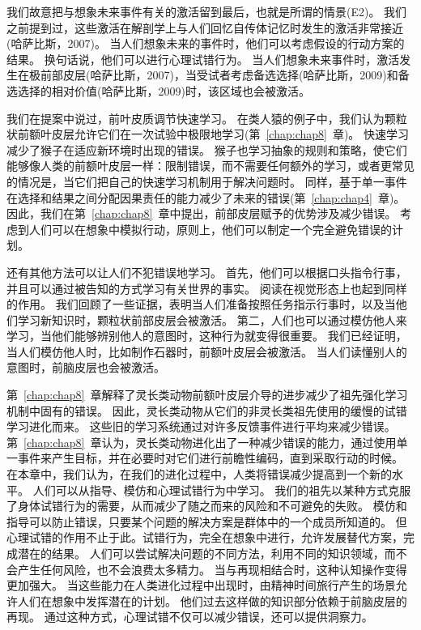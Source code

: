 我们故意把与想象未来事件有关的激活留到最后，也就是所谓的情景(E2)。
我们之前提到过，这些激活在解剖学上与人们回忆自传体记忆时发生的激活非常接近(哈萨比斯，2007)。
当人们想象未来的事件时，他们可以考虑假设的行动方案的结果。
换句话说，他们可以进行心理试错行为。
当人们想象未来事件时，激活发生在极前部皮层(哈萨比斯，2007)，当受试者考虑备选选择(哈萨比斯，2009)和备选选择的相对价值(哈萨比斯，2009)时，该区域也会被激活。


我们在提案中说过，前叶皮质调节快速学习。
在类人猿的例子中，我们认为颗粒状前额叶皮层允许它们在一次试验中极限地学习(第~\ref{chap:chap8}~章)。
快速学习减少了猴子在适应新环境时出现的错误。
猴子也学习抽象的规则和策略，使它们能够像人类的前额叶皮层一样：限制错误，而不需要任何额外的学习，或者更常见的情况是，当它们把自己的快速学习机制用于解决问题时。
同样，基于单一事件在选择和结果之间分配因果责任的能力减少了未来的错误(第~\ref{chap:chap4}~章)。
因此，我们在第~\ref{chap:chap8}~章中提出，前部皮层赋予的优势涉及减少错误。
考虑到人们可以在想象中模拟行动，原则上，他们可以制定一个完全避免错误的计划。


还有其他方法可以让人们不犯错误地学习。
首先，他们可以根据口头指令行事，并且可以通过被告知的方式学习有关世界的事实。
阅读在视觉形态上也起到同样的作用。
我们回顾了一些证据，表明当人们准备按照任务指示行事时，以及当他们学习新知识时，颗粒状前部皮层会被激活。
第二，人们也可以通过模仿他人来学习，当他们能够辨别他人的意图时，这种行为就变得很重要。
我们已经证明，当人们模仿他人时，比如制作石器时，前额叶皮层会被激活。
当人们读懂别人的意图时，前脑皮层也会被激活。


第~\ref{chap:chap8}~章解释了灵长类动物前额叶皮层介导的进步减少了祖先强化学习机制中固有的错误。
因此，灵长类动物从它们的非灵长类祖先使用的缓慢的试错学习进化而来。
这些旧的学习系统通过对许多反馈事件进行平均来减少错误。
第~\ref{chap:chap8}~章认为，灵长类动物进化出了一种减少错误的能力，通过使用单一事件来产生目标，并在必要时对它们进行前瞻性编码，直到采取行动的时候。
在本章中，我们认为，在我们的进化过程中，人类将错误减少提高到一个新的水平。
人们可以从指导、模仿和心理试错行为中学习。
我们的祖先以某种方式克服了身体试错行为的需要，从而减少了随之而来的风险和不可避免的失败。
模仿和指导可以防止错误，只要某个问题的解决方案是群体中的一个成员所知道的。
但心理试错的作用不止于此。试错行为，完全在想象中进行，允许发展替代方案，完成潜在的结果。
人们可以尝试解决问题的不同方法，利用不同的知识领域，而不会产生任何风险，也不会浪费太多精力。
当与再现相结合时，这种认知操作变得更加强大。
当这些能力在人类进化过程中出现时，由精神时间旅行产生的场景允许人们在想象中发挥潜在的计划。
他们过去这样做的知识部分依赖于前脑皮层的再现。
通过这种方式，心理试错不仅可以减少错误，还可以提供洞察力。
